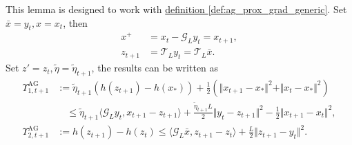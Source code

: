 \documentclass[12pt]{article}
\begin{document}
    \begin{remark}
        This lemma is designed to work with 
        \hyperref[def:ag_prox_grad_generic]{definition \ref*{def:ag_prox_grad_generic}}.
        Set $\bar x = y_t, x = x_t$, then 
        \begin{align*}
            x^+ &= x_t - \mathcal G_L y_t = x_{t + 1},
            \\
            z_{t + 1} &= \mathcal T_L y_t = \mathcal T_L \bar x.
        \end{align*}
        Set $z' = z_t, \tilde \eta = \tilde \eta_{t + 1}$, 
        the results can be written as 
        \begin{align*}
            \Upsilon_{1, t + 1}^{\text{AG}}
            &:= 
            \tilde \eta_{t + 1}(h(z_{t + 1}) - h(x_*))
            + 
            \frac{1}{2}(\Vert x_{t + 1} - x_*\Vert^2 + \Vert x_t - x_*\Vert^2)
            \\
            &\quad \le 
            \tilde \eta_{t + 1}\langle \mathcal G_L y_t, x_{t + 1} - z_{t + 1}\rangle
            + 
            \frac{\tilde \eta_{t + 1}L}{2}
            \Vert  
                y_t - z_{t + 1}
            \Vert^2
            - 
            \frac{1}{2}
            \Vert x_{t + 1} - x_t\Vert^2,  
            \\ 
            \Upsilon_{2, t + 1}^{\text{AG}}
            &:= 
            h(z_{t + 1}) - h(z_t) \le 
            \langle \mathcal G_L \bar x, z_{t + 1} - z_t \rangle + 
            \frac{L}{2}\Vert z_{t + 1} - y_t\Vert^2. 
        \end{align*}
    \end{remark}
\end{document}
